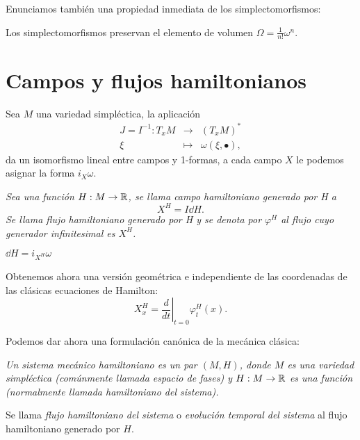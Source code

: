 Enunciamos también una propiedad inmediata de los simplectomorfismos:
\begin{prop}\label{volumen}
  Los simplectomorfismos preservan el elemento de volumen $\Omega=\frac{1}{n!}\omega^n$.
\end{prop}

\section{Campos y flujos hamiltonianos}\label{sec:hamilton}
\begin{obs}
  Sea $M$ una variedad simpléctica, la aplicación 
  \begin{equation*}
    \begin{array}{rcl}
      J=I^{-1}: T_xM & \longrightarrow & (T_xM)^* \\
      \xi & \longmapsto & \omega(\xi,\bullet),
      \end{array} 
  \end{equation*}
da un isomorfismo lineal entre campos y 1-formas, a cada campo $X$ le podemos asignar la forma $i_X \omega$.
\end{obs}
\begin{defn}
  \em
  Sea una función $H:M \rightarrow \mathbb{R}$, se llama \emph{campo hamiltoniano generado por H} a 
  \begin{equation*}
    X^H=I \dd H.
  \end{equation*}
  Se llama \emph{flujo hamiltoniano generado por H} y se denota por $\varphi^H$ al flujo cuyo generador infinitesimal es $X^H$.
\end{defn}
\begin{obs}
  $\dd H = i_{X^H}\omega$
\end{obs}
\begin{obs}
  Obtenemos ahora una versión geométrica e independiente de las coordenadas de las clásicas ecuaciones de Hamilton:
  \begin{equation*}
    X^H_x= \left.\frac{d}{dt}\right| _{t=0}\varphi^H_t(x).
  \end{equation*}
\end{obs}
Podemos dar ahora una formulación canónica de la mecánica clásica:
\begin{defn}
  \em
  Un \emph{sistema mecánico hamiltoniano} es un par $(M,H)$, donde $M$ es una variedad simpléctica (comúnmente llamada \emph{espacio de fases}) y $H:M \rightarrow \mathbb{R}$ es una función (normalmente llamada \emph{hamiltoniano} del sistema).

  Se llama \emph{flujo hamiltoniano del sistema} o \emph{evolución temporal del sistema} al flujo hamiltoniano generado por $H$.
\end{defn}

